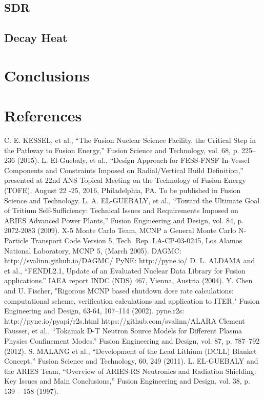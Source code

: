 \documentclass[12pt, letterpaper]{elsarticle}
\begin{document}
\subsection{SDR} \label{SDR}
\subsection{Decay Heat} \label{Decay Heat}

\section{Conclusions} \label{conclusion}

\newpage
\section{References}
\begin{thebibliography}{10} 
C. E. KESSEL, et al., {“The Fusion Nuclear Science Facility, the Critical Step in the Pathway to Fusion Energy,” Fusion Science and Technology, vol. 68, p. 225–236 (2015).}
L. El-Guebaly, et al., {“Design Approach for FESS-FNSF In-Vessel Components and Constraints Imposed on Radial/Vertical Build Definition,” presented at 22nd ANS Topical Meeting on the Technology of Fusion Energy (TOFE), August 22 -25, 2016, Philadelphia, PA. To be published in Fusion Science and Technology.}
L. A. EL-GUEBALY, et al., {“Toward the Ultimate Goal of Tritium Self-Sufficiency: Technical Issues and Requirements Imposed on ARIES Advanced Power Plants,” Fusion Engineering and Design, vol. 84, p. 2072-2083 (2009).}
X-5 Monte Carlo Team, {MCNP a General Monte Carlo N-Particle Transport Code Version 5, Tech. Rep. LA-CP-03-0245, Los Alamos National Laboratory, MCNP 5, (March 2005).}
{DAGMC: http://svalinn.github.io/DAGMC/}
{PyNE: http://pyne.io/} 
D. L. ALDAMA and et al., {“FENDL2.1, Update of an Evaluated Nuclear Data Library for Fusion applications.” IAEA report INDC (NDS) 467, Vienna, Austria (2004).}
Y. Chen and U. Fischer, {"Rigorous MCNP based shutdown dose rate calculations: computational scheme, verification calculations and application to ITER." Fusion Engineering and Design, 63-64, 107–114 (2002).}
{pyne.r2s: http://pyne.io/pyapi/r2s.html}
{https://github.com/svalinn/ALARA}
Clement Fausser, et al., {“Tokamak D-T Neutron Source Models for Different Plasma Physics Confinement Modes.” Fusion Engineering and Design, vol. 87, p. 787–792 (2012).}
S. MALANG et al., {“Development of the Lead Lithium (DCLL) Blanket Concept,” Fusion Science and Technology, 60, 249 (2011).}
L. EL-GUEBALY and the ARIES Team, {“Overview of ARIES-RS Neutronics and Radiation Shielding: Key Issues and Main Conclusions,” Fusion Engineering and Design, vol. 38, p. 139 – 158 (1997).}
\end{thebibliography}
\end{document}
